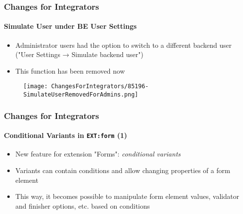 
\begin{frame}[fragile]
	\frametitle{Changes for Integrators}
	\framesubtitle{Simulate User under BE User Settings}

	\begin{itemize}
		\item Administrator users had the option to switch to a different backend
			user ("User Settings → Simulate backend user")
		\item This function has been removed now
	\end{itemize}

	\begin{figure}
		\texttt{[image: ChangesForIntegrators/85196-SimulateUserRemovedForAdmins.png]}
	\end{figure}

\end{frame}


\begin{frame}[fragile]
	\frametitle{Changes for Integrators}
	\framesubtitle{Conditional Variants in \texttt{EXT:form} (1)}

	\begin{itemize}
		\item New feature for extension "Forms": \textit{conditional variants}
		\item Variants can contain conditions and allow changing properties of a
			form element
		\item This way, it becomes possible to manipulate form element values,
			validator and finisher options, etc. based on conditions

	\end{itemize}

\end{frame}



